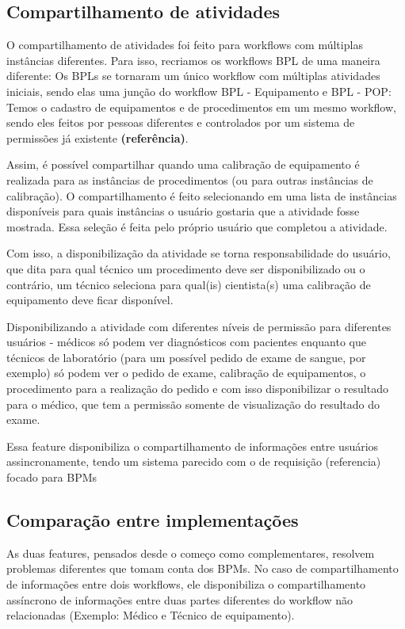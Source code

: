 \subsection{Compartilhamento de atividades}

O compartilhamento de atividades foi feito para workflows com múltiplas instâncias diferentes. Para isso, recriamos os workflows BPL de uma maneira diferente: Os BPLs se tornaram um único workflow com múltiplas atividades iniciais, sendo elas uma junção do workflow BPL - Equipamento e BPL - POP: Temos o cadastro de equipamentos e de procedimentos em um mesmo workflow, sendo eles feitos por pessoas diferentes e controlados por um sistema de permissões já existente \textbf{(referência)}.

Assim, é possível compartilhar quando uma calibração de equipamento é realizada para as instâncias de procedimentos (ou para outras instâncias de calibração). O compartilhamento é feito selecionando em uma lista de instâncias disponíveis para quais instâncias o usuário gostaria que a atividade fosse mostrada. Essa seleção é feita pelo próprio usuário que completou a atividade.

Com isso, a disponibilização da atividade se torna responsabilidade do usuário, que dita para qual técnico um procedimento deve ser disponibilizado ou o contrário, um técnico seleciona para qual(is) cientista(s) uma calibração de equipamento deve ficar disponível.

Disponibilizando a atividade com diferentes níveis de permissão para diferentes usuários - médicos só podem ver diagnósticos com pacientes enquanto que técnicos de laboratório (para um possível pedido de exame de sangue, por exemplo) só podem ver o pedido de exame, calibração de equipamentos, o procedimento para a realização do pedido e com isso disponibilizar o resultado para o médico, que tem a permissão somente de visualização do resultado do exame.

Essa feature disponibiliza o compartilhamento de informações entre usuários assincronamente, tendo um sistema parecido com o de requisição (referencia) focado para BPMs

\subsection{Comparação entre implementações}

As duas features, pensados desde o começo como complementares, resolvem problemas diferentes que tomam conta dos BPMs. No caso de compartilhamento de informações entre dois workflows, ele disponibiliza o compartilhamento assíncrono de informações entre duas partes diferentes do workflow não relacionadas (Exemplo: Médico e Técnico de equipamento).

